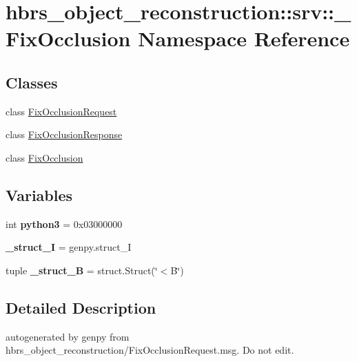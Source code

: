 \hypertarget{namespacehbrs__object__reconstruction_1_1srv_1_1___fix_occlusion}{\section{hbrs\-\_\-object\-\_\-reconstruction\-:\-:srv\-:\-:\-\_\-\-Fix\-Occlusion \-Namespace \-Reference}
\label{namespacehbrs__object__reconstruction_1_1srv_1_1___fix_occlusion}
}
\subsection*{\-Classes}
\begin{DoxyCompactItemize}
\item 
class \hyperlink{classhbrs__object__reconstruction_1_1srv_1_1___fix_occlusion_1_1_fix_occlusion_request}{\-Fix\-Occlusion\-Request}
\item 
class \hyperlink{classhbrs__object__reconstruction_1_1srv_1_1___fix_occlusion_1_1_fix_occlusion_response}{\-Fix\-Occlusion\-Response}
\item 
class \hyperlink{classhbrs__object__reconstruction_1_1srv_1_1___fix_occlusion_1_1_fix_occlusion}{\-Fix\-Occlusion}
\end{DoxyCompactItemize}
\subsection*{\-Variables}
\begin{DoxyCompactItemize}
\item 
\hypertarget{namespacehbrs__object__reconstruction_1_1srv_1_1___fix_occlusion_a4c7dad148898433b90e5ae9472683363}{int {\bfseries python3} = 0x03000000}\label{namespacehbrs__object__reconstruction_1_1srv_1_1___fix_occlusion_a4c7dad148898433b90e5ae9472683363}

\item 
\hypertarget{namespacehbrs__object__reconstruction_1_1srv_1_1___fix_occlusion_ad3570bc8f60a668990d4ae9e5f95aade}{{\bfseries \-\_\-struct\-\_\-\-I} = genpy.\-struct\-\_\-\-I}\label{namespacehbrs__object__reconstruction_1_1srv_1_1___fix_occlusion_ad3570bc8f60a668990d4ae9e5f95aade}

\item 
\hypertarget{namespacehbrs__object__reconstruction_1_1srv_1_1___fix_occlusion_a566343094ecffe63a9af35eff0d7bc70}{tuple {\bfseries \-\_\-struct\-\_\-\-B} = struct.\-Struct(\char`\"{}$<$\-B\char`\"{})}\label{namespacehbrs__object__reconstruction_1_1srv_1_1___fix_occlusion_a566343094ecffe63a9af35eff0d7bc70}

\end{DoxyCompactItemize}


\subsection{\-Detailed \-Description}
\begin{DoxyVerb}autogenerated by genpy from hbrs_object_reconstruction/FixOcclusionRequest.msg. Do not edit.\end{DoxyVerb}
 